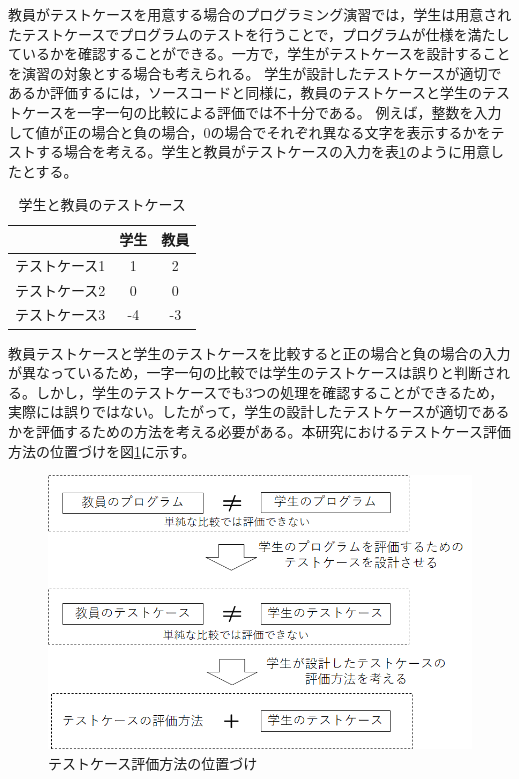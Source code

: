 \documentclass{tpu-sotu}
\begin{document}
教員がテストケースを用意する場合のプログラミング演習では，学生は用意されたテストケースでプログラムのテストを行うことで，プログラムが仕様を満たしているかを確認することができる。一方で，学生がテストケースを設計することを演習の対象とする場合も考えられる。
学生が設計したテストケースが適切であるか評価するには，ソースコードと同様に，教員のテストケースと学生のテストケースを一字一句の比較による評価では不十分である。
例えば，整数を入力して値が正の場合と負の場合，0の場合でそれぞれ異なる文字を表示するかをテストする場合を考える。学生と教員がテストケースの入力を表\ref{testcase}のように用意したとする。
\begin{table}[htb]
\centering
\caption{学生と教員のテストケース}
  \begin{tabular}{|c|c|c|} \hline
     & 学生 & 教員  \\ \hline
    テストケース1 & 1 & 2  \\ \hline
    テストケース2 & 0 & 0 \\ \hline
    テストケース3 & -4 & -3 \\ \hline
  \end{tabular}
  \label{testcase}
\end{table}
教員テストケースと学生のテストケースを比較すると正の場合と負の場合の入力が異なっているため，一字一句の比較では学生のテストケースは誤りと判断される。しかし，学生のテストケースでも3つの処理を確認することができるため，実際には誤りではない。したがって，学生の設計したテストケースが適切であるかを評価するための方法を考える必要がある。本研究におけるテストケース評価方法の位置づけを図\ref{a1}に示す。
\begin{figure}[h]
  \centering
  \includegraphics[width=130mm]{テストケース評価方法の位置づけ.png}
  \caption{テストケース評価方法の位置づけ}
  \label{a1}
\end{figure}
\end{document}
